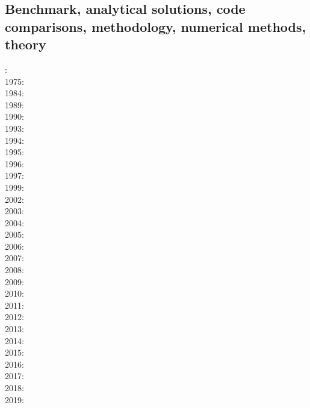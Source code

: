\noindent
\cite{mudm02}
\cite{mumc03}
\cite{mumc04}
\cite{besb06}
\cite{faca13}
\cite{facc14}

\subsection*{Benchmark, analytical solutions, code comparisons, methodology, numerical methods, theory}

: \cite{hiac74}\\
1975: \cite{waki75a}\cite{waki75b}\\
1984: \cite{yusa84}\\
1989: \cite{blbc89}\\
1990: \cite{trab90}\\
1993: \cite{leka93}\\
1994: \cite{brsa94}\\
1995: \cite{brsa95}\cite{moso95}\cite{full95}\\
1996: \cite{zhon96}\cite{mozg96}\\
1997: \cite{rist97}\\
1999: \cite{lind99}\cite{bird99}\\
2002: \cite{mudm02}\\
2003: \cite{taki03}\cite{modm03}\cite{geyu03}\cite{geyu03b}\cite{taxi03}\\
2004: \cite{kaps04}\cite{kasa04}\cite{kaks08}\cite{mumc04}\\
2005: \cite{mure05}\\
2006: \cite{kapo06}\cite{more06}\cite{omma06}\cite{mudm06}\\
2007: \cite{toma07}\cite{chcc07}\cite{kabe07}\cite{kaks07}\cite{moql07}\cite{geyu07}\\
2008: \cite{zhmt08}\cite{deka08}\cite{trub08}\cite{krdp08}\cite{mamo08}\cite{gepd98}
      \cite{vack08}\cite{heta08}\cite{brtf08}\cite{daks08}\\
2009: \cite{king09}\cite{geum09}\cite{vemm09}\cite{qurj09}\\
2010: \cite{kaus10}\cite{kamm10}\cite{egat10}\cite{kilv10}\\
2011: \cite{dumg11}\cite{uibb11}\cite{hegc11}\cite{muso11}\\
2012: \cite{crsg12}\cite{chgv12}\cite{krwd12}\cite{may12}\cite{gerb12}\cite{asmo12}\\
2013: \cite{chtl13}\cite{kemk13}\cite{gemd13}\\
2014: \cite{thmk14}\cite{mabl14}\cite{lopp14}\\
2015: \cite{lelk15}\cite{rumi15}\cite{chpe15}\cite{mabl15}\\
2016: \cite{dumy16}\cite{blmp16}\\
2017: \cite{robh17}\cite{wisv17}\cite{majc17}\\
2018: \cite{memm18}\cite{cram18}\\
2019: \cite{clhe19}\cite{liki19}\cite{demh19}\cite{galb19}\cite{frtv19}

